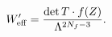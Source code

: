 \begin{equation}\label{Eq:Weff4}
W^\prime_{\rm eff}=
\frac{
\det T\cdot f(Z)
}
{
	\Lambda^{2N_f-3}
}.
\end{equation}


